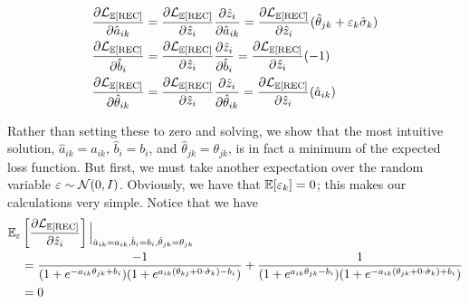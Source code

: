 \begin{equation}
  \begin{split}
  \frac{\partial \mathcal{L}_{\mathbb{E}[\text{REC}]}}{\partial \hat a_{ik}} &= 
  \frac{\partial \mathcal{L}_{\mathbb{E}[\text{REC}]}}{\partial \hat z_i}\frac{\partial \hat z_i}{\partial \hat a_{ik}} = \frac{\partial \mathcal{L}_{\mathbb{E}[\text{REC}]}}{\partial \hat z_i} (\hat \theta_{jk} + \varepsilon_k \hat \sigma_k) \\
  \frac{\partial \mathcal{L}_{\mathbb{E}[\text{REC}]}}{\partial \hat b_i} &= 
  \frac{\partial \mathcal{L}_{\mathbb{E}[\text{REC}]}}{\partial \hat z_i}\frac{\partial \hat z_i}{\partial \hat b_i} = \frac{\partial \mathcal{L}_{\mathbb{E}[\text{REC}]}}{\partial \hat z_i} (-1) \\
  \frac{\partial \mathcal{L}_{\mathbb{E}[\text{REC}]}}{\partial \hat \theta_{ik}} &= 
  \frac{\partial \mathcal{L}_{\mathbb{E}[\text{REC}]}}{\partial \hat z_i}\frac{\partial \hat z_i}{\partial \hat \theta_{ik}} = \frac{\partial \mathcal{L}_{\mathbb{E}[\text{REC}]}}{\partial \hat z_i} (\hat a_{ik}) 
\end{split}
 \label{eq:param_deriv}
\end{equation}

Rather than setting these to zero and solving, we show that the most intuitive solution, $\hat a_{ik} = a_{ik}$, $\hat b_i = b_i$, and $\hat \theta_{jk} = \theta_{jk}$, is in fact a minimum of the expected loss function. But first, we must take another expectation over the random variable $\varepsilon \sim \mathcal{N}(0,I)$. Obviously, we have that $\mathbb{E}[\varepsilon_k] = 0$; this makes our calculations very simple. Notice that we have
\begin{equation}
  \begin{split}
  \mathbb{E}_\varepsilon &\left[\frac{\partial \mathcal{L}_{\mathbb{E}[\text{REC}]}}{\partial \hat z_i}\right] \Big|_{\hat a_{ik} = a_{ik}, \hat b_i = b_i, \hat \theta_{jk} = \theta_{jk}} \\
  &= \frac{-1}{(1 + e^{-a_{ik}\theta_{jk} + b_i})(1 + e^{a_{ik} (\theta_{kj} + 0 \cdot \hat \sigma_k) - b_i})} + \frac{1}{(1 + e^{a_{ik}\theta_{jk} - b_i})(1 + e^{-a_{ik}(\theta_{jk} + 0 \cdot \hat \sigma_k) + b_i})} \\
  &= 0
\end{split}
\end{equation}

